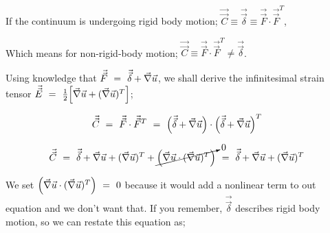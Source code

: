 \documentclass{article}
\begin{document}
If the continuum is undergoing rigid body motion; \begin{math} \vec{\vec{C}} \equiv \vec{\vec{\delta}} \equiv \vec{\vec{F}} \cdot \vec{\vec{F}}^T \end{math},

Which means for non-rigid-body motion; \begin{math} \vec{\vec{C}} \equiv \vec{\vec{F}} \cdot \vec{\vec{F}}^T \neq \vec{\vec{\delta}} \end{math}.

Using knowledge that \begin{math} \vec{\vec{F}} \hspace{0.125cm}  = \hspace{0.125cm} \vec{\vec{\delta}} + \vec{\nabla} \vec{u} \end{math}, we shall derive the infinitesimal strain tensor \begin{math} \vec{\vec{E}} \hspace{0.125cm}  = \hspace{0.125cm} \frac{1}{2} \Big[ \vec{\nabla} \vec{u} + ( \vec{\nabla} \vec{u} )^T \Big] \end{math};

\begin{equation} \label{eb-eq-1-77}
\vec{\vec{C}} \hspace{0.125cm} = \hspace{0.125cm} \vec{\vec{F}} \cdot \vec{\vec{F}}^T \hspace{0.125cm} = \hspace{0.125cm} \Big( \vec{\vec{\delta}} + \vec{\nabla} \vec{u} \Big) \cdot \Big( \vec{\vec{\delta}} + \vec{\nabla} \vec{u} \Big)^T \hspace{0.125cm} 
\end{equation} 

\begin{equation} \label{eb-eq-1-78}
\vec{\vec{C}} \hspace{0.125cm} = \hspace{0.125cm} \vec{\vec{\delta}} + \vec{\nabla} \vec{u} + ( \vec{\nabla} \vec{u} )^T + \cancelto{0}{\Big( \vec{\nabla} \vec{u} \cdot ( \vec{\nabla} \vec{u} )^T \Big)} \hspace{0.125cm} = \hspace{0.125cm}  \vec{\vec{\delta}} + \vec{\nabla} \vec{u} + ( \vec{\nabla} \vec{u} )^T \hspace{0.125cm} 
\end{equation} 

We set \begin{math} \Big( \vec{\nabla} \vec{u} \cdot ( \vec{\nabla} \vec{u} )^T \Big) \hspace{0.125cm} = \hspace{0.125cm} 0 \end{math} because it would add a nonlinear term to out equation and we don't want that. If you remember, \begin{math} \vec{\vec{\delta}} \end{math} describes rigid body motion, so we can restate this equation as;
\end{document}
